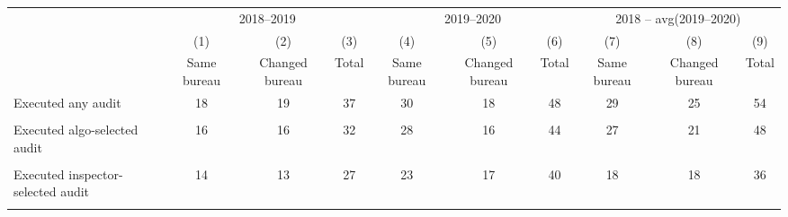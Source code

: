{
\def\sym#1{\ifmmode^{#1}\else\(^{#1}\)\fi}
\begin{tabular}{l*{9}{c}}
\toprule
            &\multicolumn{3}{c}{2018–2019}                                    &\multicolumn{3}{c}{2019–2020}                                    &\multicolumn{3}{c}{2018 – avg(2019–2020)}                        \\\cmidrule(lr){2-4}\cmidrule(lr){5-7}\cmidrule(lr){8-10}
            &\multicolumn{1}{c}{(1)}&\multicolumn{1}{c}{(2)}&\multicolumn{1}{c}{(3)}&\multicolumn{1}{c}{(4)}&\multicolumn{1}{c}{(5)}&\multicolumn{1}{c}{(6)}&\multicolumn{1}{c}{(7)}&\multicolumn{1}{c}{(8)}&\multicolumn{1}{c}{(9)}\\
            &\multicolumn{1}{c}{Same bureau}&\multicolumn{1}{c}{Changed bureau}&\multicolumn{1}{c}{Total}&\multicolumn{1}{c}{Same bureau}&\multicolumn{1}{c}{Changed bureau}&\multicolumn{1}{c}{Total}&\multicolumn{1}{c}{Same bureau}&\multicolumn{1}{c}{Changed bureau}&\multicolumn{1}{c}{Total}\\
\midrule
Executed any audit&          18         &          19         &          37         &          30         &          18         &          48         &          29         &          25         &          54         \\
            &                     &                     &                     &                     &                     &                     &                     &                     &                     \\
Executed algo-selected audit&          16         &          16         &          32         &          28         &          16         &          44         &          27         &          21         &          48         \\
            &                     &                     &                     &                     &                     &                     &                     &                     &                     \\
Executed inspector-selected audit&          14         &          13         &          27         &          23         &          17         &          40         &          18         &          18         &          36         \\
            &                     &                     &                     &                     &                     &                     &                     &                     &                     \\

\end{tabular}}
